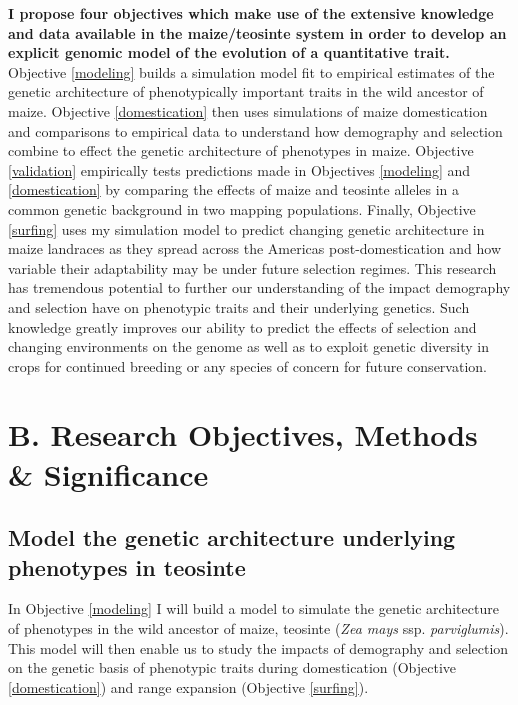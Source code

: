 \textbf{I propose four objectives which make use of the extensive knowledge and data available in the maize\//teosinte system in order to develop an explicit genomic model of the evolution of a quantitative trait.} Objective \ref{modeling} builds a simulation model fit to empirical estimates of the genetic architecture of phenotypically important traits in the wild ancestor of maize. Objective \ref{domestication} then uses simulations of maize domestication and comparisons to empirical data to understand how demography and selection combine to effect the genetic architecture of phenotypes in maize.  Objective \ref{validation} empirically tests  predictions made in Objectives \ref{modeling} and \ref{domestication} by comparing the effects of maize and teosinte alleles in a common genetic background in two mapping populations. Finally, Objective \ref{surfing} uses my simulation model to predict changing genetic architecture in maize landraces as they spread across the Americas post-domestication and how variable their adaptability may be under future selection regimes. This research has tremendous potential to further our understanding of the impact demography and selection have on phenotypic traits and their underlying genetics. Such knowledge greatly improves our ability to predict the effects of selection and changing environments on the genome as well as to exploit genetic diversity in crops for continued breeding or any species of concern for future conservation. \vspace{-3ex}


\section*{B. Research Objectives, Methods \& Significance}\vspace{-1ex}

\renewcommand\thesubsection{\Roman {subsection}}

\subsection{Model the genetic architecture underlying phenotypes in teosinte}\vspace{-1ex}
\label{modeling}
In Objective \ref{modeling} I will build a model to simulate the genetic architecture of phenotypes in the wild ancestor of maize, teosinte (\emph{Zea mays} ssp. \emph{parviglumis}). This model will then enable us to study the impacts of demography and selection on the genetic basis of phenotypic traits during domestication (Objective \ref{domestication}) and range expansion (Objective \ref{surfing}).

